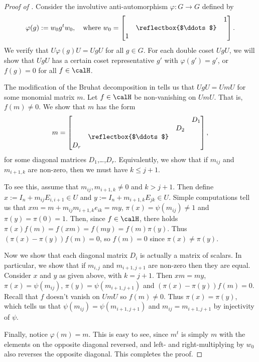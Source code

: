 \begin{proof}[Proof of ]
    Consider the involutive anti-automorphism $\varphi\colon G \to G$ defined by
    \[
        \varphi(g) := w_0 g^t w_0,\quad\text{where}\ w_0 =
        \begin{bmatrix}
              &                       & 1 \\
              & \reflectbox{$\ddots$} &   \\
            1 &                       &
        \end{bmatrix}.
    \]
    We verify that $U\varphi(g)U=UgU$ for all $g\in G$.
    For each double coset $UgU$, we will show that $UgU$ has a certain coset representative $g'$ with $\varphi(g')=g'$, or $f(g)=0$ for all $f\in\calH$.

    The modification of the Bruhat decomposition in  tells us that $UgU=UmU$ for some monomial matrix $m$.
    Let $f\in\calH$ be non-vanishing on $UmU$.
    That is, $f(m)\neq 0$.
    We show that $m$ has the form
    \[
        m = \begin{bmatrix}
                &                       &     & D_1 \\
                &                       & D_2 &     \\
                & \reflectbox{$\ddots$} &     &     \\
            D_r &                       &     &
        \end{bmatrix},
    \]
    for some diagonal matrices $D_1$,\ldots,$D_r$.
    Equivalently, we show that if $m_{ij}$ and $m_{i+1,k}$ are non-zero, then we must have $k\leq j+1$.

    To see this, assume that $m_{ij},m_{i+1,k}\neq 0$ and $k>j+1$.
    Then define $x :=I_n + m_{ij}E_{i,i+1}\in U$ and $y:= I_n +m_{i+1,k}E_{jk}\in U$.
    Simple computations tell us that $xm = m+m_{ij}m_{i+1,k}e_{ik} = my$, $\pi(x)=\psi(m_{ij})\neq 1$ and $\pi(y)=\pi(0)=1$.
    Then, since $f\in\calH$, there holds $\pi(x)f(m)=f(xm)=f(my)=f(m)\pi(y)$.
    Thus $(\pi(x)-\pi(y))f(m)=0$, so $f(m)=0$ since $\pi(x)\neq \pi(y)$.

    Now we show that each diagonal matrix $D_i$ is actually a matrix of scalars.
    In particular, we show that if $m_{i,j}$ and $m_{i+1,j+1}$ are non-zero then they are equal.
    Consider $x$ and $y$ as given above, with $k=j+1$.
    Then $xm=my$, $\pi(x)=\psi(m_{ij})$, $\pi(y)=\psi(m_{i+1,j+1})$ and $(\pi(x)-\pi(y))f(m)=0$.
    Recall that $f$ doesn't vanish on $UmU$ so $f(m)\neq 0$.
    Thus $\pi(x)=\pi(y)$, which tells us that $\psi(m_{ij})=\psi(m_{i+1,j+1})$ and $m_{ij}=m_{i+1,j+1}$ by injectivity of $\psi$.

    Finally, notice $\varphi(m)=m$.
    This is easy to see, since $m^t$ is simply $m$ with the elements on the opposite diagonal reversed, and left- and right-multiplying by $w_0$ also reverses the opposite diagonal.
    This completes the proof.
\end{proof}

